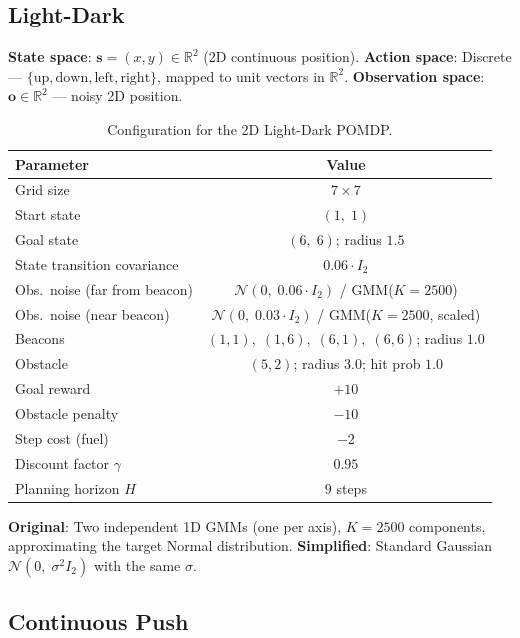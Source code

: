 \documentclass[acmlarge, manuscript, screen, review, natbib=false, oneside]{acmart}
\begin{document}
\subsection{Light-Dark}

\textbf{State space}: $\mathbf{s} = (x, y) \in \mathbb{R}^2$ (2D continuous position).
\textbf{Action space}: Discrete — $\{\text{up}, \text{down}, \text{left}, \text{right}\}$, mapped to unit vectors in $\mathbb{R}^2$.
\textbf{Observation space}: $\mathbf{o} \in \mathbb{R}^2$ — noisy 2D position.

\begin{table}[ht]
	\centering
	\small
	\setlength{\tabcolsep}{4pt}
	\begin{tabular}{|l|c|}
		\hline
		\textbf{Parameter} & \textbf{Value} \\
		\hline
		Grid size & $7 \times 7$ \\
		\hline
		Start state & $(1,\;1)$ \\
		\hline
		Goal state & $(6,\;6)$; radius $1.5$ \\
		\hline
		State transition covariance & $0.06 \cdot I_2$ \\
		\hline
		Obs.\ noise (far from beacon) & $\mathcal{N}(0,\;0.06\cdot I_2)$ / GMM($K{=}2500$) \\
		\hline
		Obs.\ noise (near beacon) & $\mathcal{N}(0,\;0.03\cdot I_2)$ / GMM($K{=}2500$, scaled) \\
		\hline
		Beacons & $(1,1),\;(1,6),\;(6,1),\;(6,6)$; radius $1.0$ \\
		\hline
		Obstacle & $(5,2)$; radius $3.0$; hit prob $1.0$ \\
		\hline
		Goal reward & $+10$ \\
		\hline
		Obstacle penalty & $-10$ \\
		\hline
		Step cost (fuel) & $-2$ \\
		\hline
		Discount factor $\gamma$ & $0.95$ \\
		\hline
		Planning horizon $H$ & $9$ steps \\
		\hline
	\end{tabular}
	\caption{Configuration for the 2D Light-Dark POMDP.}
	\label{tab:ld_full_config}
\end{table}

\textbf{Original}: Two independent 1D GMMs (one per axis), $K = 2500$ components, approximating the target Normal distribution.
\textbf{Simplified}: Standard Gaussian $\mathcal{N}(0,\;\sigma^2 I_2)$ with the same $\sigma$.

\subsection{Continuous Push}
\end{document}
